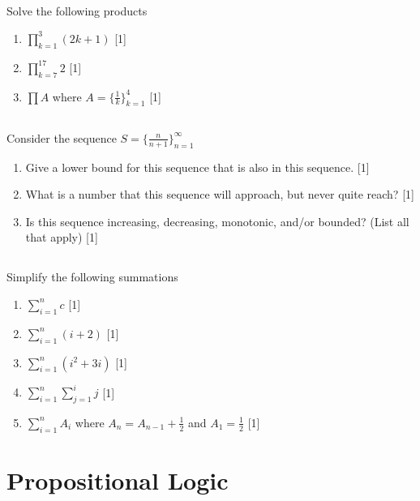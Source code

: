 \documentclass[twocolumn]{article}
\newcounter{pmarks}
\newcounter{marks}
\newcommand\mrk[1]{{\hfill\color{blue}\small[{#1}]}\addtocounter{pmarks}{#1}\addtocounter{marks}{#1}}
\begin{document}
\subsection{}

    Solve the following products

    \begin{enumerate}
        \item $ \prod_{k=1}^{3} (2k + 1) $ \mrk{1}
        \item $ \prod_{k=7}^{17} 2 $ \mrk{1}
        \item $ \prod A $ where $ A = \{ \frac{1}{k} \}^{4}_{k=1} $ \mrk{1}
    \end{enumerate}

\subsection{}

    Consider the sequence $S = \{ \frac{n}{n+1} \}^\infty_{n=1} $

    \begin{enumerate}
        \item Give a lower bound for this sequence that is also in this sequence. \mrk{1}
        \item What is a number that this sequence will approach, but never quite reach? \mrk{1}
        \item Is this sequence increasing, decreasing, monotonic, and/or bounded? (List all that apply) \mrk{1}
    \end{enumerate}

\subsection{}

Simplify the following summations

\begin{enumerate}
    \item $ \sum_{i=1}^{n} c $ \mrk{1}
    \item $ \sum_{i=1}^{n} ( i + 2 ) $ \mrk{1}
    \item $ \sum_{i=1}^{n} ( i^2 + 3i ) $ \mrk{1}
    \item $ \sum_{i=1}^{n} \sum_{j=1}^{i} j $ \mrk{1}
    \item $ \sum_{i=1}^{n} A_i $ where $ A_n = A_{n-1} + \frac{1}{2} $ and $ A_1 = \frac{1}{2} $ \mrk{1}
\end{enumerate}


\clearpage
\section{Propositional Logic}
\end{document}
